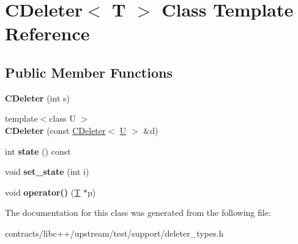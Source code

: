 \hypertarget{class_c_deleter}{}\section{C\+Deleter$<$ T $>$ Class Template Reference}
\label{class_c_deleter}
\subsection*{Public Member Functions}
\begin{DoxyCompactItemize}
\item 
\mbox{\label{class_c_deleter_a610a08507a029bfcb4cfbd2fc2d7f738}} 
{\bfseries C\+Deleter} (int s)
\item 
\mbox{\label{class_c_deleter_a2ca745e82f26dfaf0adc112a3a4b80e0}} 
{\footnotesize template$<$class U $>$ }\\{\bfseries C\+Deleter} (const \mbox{\hyperlink{class_c_deleter}{C\+Deleter}}$<$ \mbox{\hyperlink{union_u}{U}} $>$ \&d)
\item 
\mbox{\label{class_c_deleter_a261161cbbbed92a95317c1155ea54029}} 
int {\bfseries state} () const
\item 
\mbox{\label{class_c_deleter_a98aeb0216396f9f016a52ab28c3ea061}} 
void {\bfseries set\+\_\+state} (int i)
\item 
\mbox{\label{class_c_deleter_acc6ca417d9db32008d7b695dedcc0f1e}} 
void {\bfseries operator()} (\mbox{\hyperlink{struct_t}{T}} $\ast$p)
\end{DoxyCompactItemize}


The documentation for this class was generated from the following file\+:\begin{DoxyCompactItemize}
\item 
contracts/libc++/upstream/test/support/deleter\+\_\+types.\+h\end{DoxyCompactItemize}
